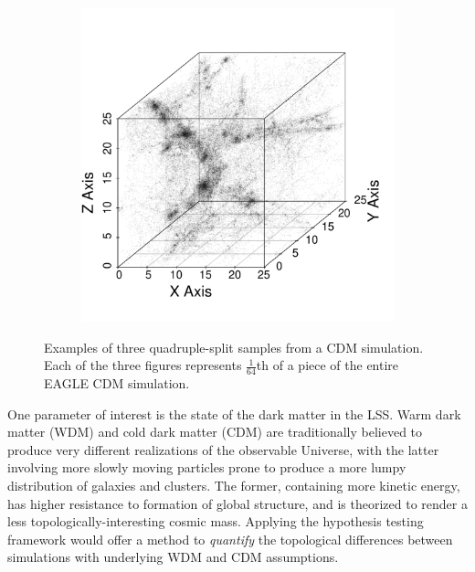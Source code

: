 \documentclass[12pt]{article}
\begin{document}
\begin{figure}[htp!]
\begin{subfigure}{0.25\textwidth}
    \label{fig:cubeDiagsB}
  \end{subfigure}
    \begin{subfigure}{0.25\textwidth}
    \centering
        \caption{}
  \includegraphics[width=\linewidth]{figure_10_cdm_slice_51.pdf}
    \label{fig:cubeDiagsC}
  \end{subfigure}
    \caption{Examples of three quadruple-split samples from a CDM simulation. Each of the three figures represents $\frac{1}{64}$th of a piece of the entire EAGLE CDM simulation.}
    \label{fig:cubeDiags}
\end{figure}

One parameter of interest is the state of the dark matter in the LSS. Warm dark matter (WDM) and cold dark matter (CDM) are traditionally believed to produce very different realizations of the observable Universe, with the latter involving more slowly moving particles prone to produce a more lumpy distribution of galaxies and clusters. The former, containing more kinetic energy, has higher resistance to formation of global structure, and is theorized to render a less topologically-interesting cosmic mass. Applying the hypothesis testing framework would offer a method to \emph{quantify} the topological differences between simulations with underlying WDM and CDM assumptions.
\end{document}
